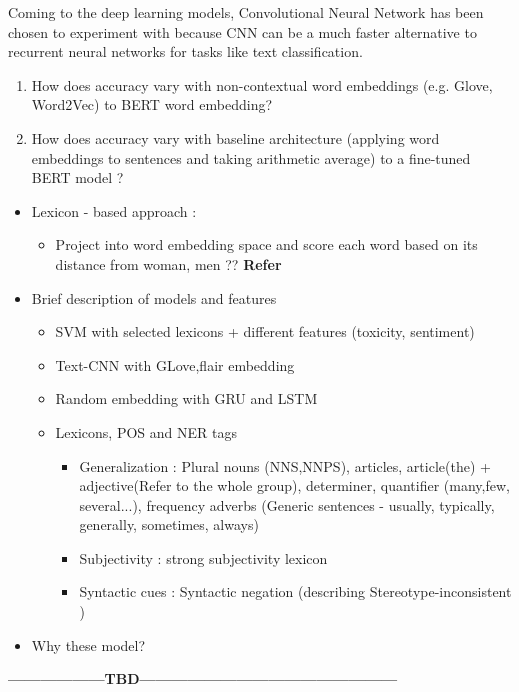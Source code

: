Coming to the deep learning models, Convolutional Neural Network has been chosen to experiment with because CNN can be a much faster alternative to recurrent neural networks for tasks like text classification. 
\begin{enumerate}
    \item How does accuracy vary with non-contextual word embeddings (e.g. Glove, Word2Vec) to BERT word embedding?
    \item How does accuracy vary with baseline architecture (applying word embeddings to sentences and taking arithmetic average) to a fine-tuned BERT model ?
\end{enumerate}

    \begin{itemize}
        \item Lexicon - based approach : 
        \begin{itemize}
            \item Project into word embedding space and score each word based on its distance from woman, men ??
            \textbf{Refer }\cite{cryan2020detecting}
        \end{itemize}
        \item Brief description of  models and features
        \begin{itemize}
            \item SVM with selected lexicons + different features (toxicity, sentiment)
            \item Text-CNN with GLove,flair embedding
            \item Random embedding with GRU and LSTM 
        \end{itemize}
        \begin{itemize}
            \item Lexicons, POS and NER tags 
            \begin{itemize}
                \item Generalization : Plural nouns (NNS,NNPS), articles, article(the) + adjective(Refer to the whole group), determiner, quantifier (many,few, several...), frequency adverbs (Generic sentences - usually, typically, generally, sometimes, always)
                \item Subjectivity : strong subjectivity lexicon \cite{tangpersonalized}
                \item Syntactic cues : Syntactic negation (describing Stereotype-inconsistent )
            \end{itemize}
        \end{itemize}
        \item Why these model?
    \end{itemize}
\textbf{------------------TBD------------------------------------------------}
